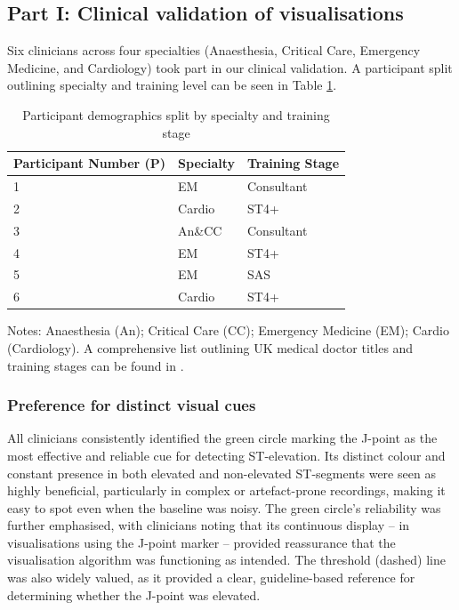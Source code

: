 \documentclass[
  10pt,
  letterpaper,
]{article}
\begin{document}
\subsection{Part I: Clinical validation of
visualisations}\label{part-i-clinical-validation-of-visualisations-1}

Six clinicians across four specialties (Anaesthesia, Critical Care,
Emergency Medicine, and Cardiology) took part in our clinical
validation. A participant split outlining specialty and training level
can be seen in Table \ref{specialty}.

\begin{table}[ht]
\caption{Participant demographics split by specialty and training stage\label{specialty}}%
\centering
\begin{tabularx}{.8\textwidth}{l X X}
\toprule
Participant Number (P) & Specialty  & Training Stage \\
\midrule
1    & EM           & Consultant  \\
2    & Cardio       & ST4+  \\
3    & An\&CC       & Consultant  \\
4    & EM           & ST4+  \\
5    & EM           & SAS  \\
6    & Cardio       & ST4+ \\
\bottomrule
\end{tabularx}
\begin{tablenotes}
\item Notes: Anaesthesia (An); Critical Care (CC); Emergency Medicine (EM); Cardio (Cardiology). A comprehensive list outlining UK medical doctor titles and training stages can be found in \cite{bma_training}.
\end{tablenotes}
\end{table}%

\subsubsection{Preference for distinct visual
cues}\label{preference-for-distinct-visual-cues}

All clinicians consistently identified the green circle marking the
J-point as the most effective and reliable cue for detecting
ST-elevation. Its distinct colour and constant presence in both elevated
and non-elevated ST-segments were seen as highly beneficial,
particularly in complex or artefact-prone recordings, making it easy to
spot even when the baseline was noisy. The green circle's reliability
was further emphasised, with clinicians noting that its continuous
display -- in visualisations using the J-point marker -- provided
reassurance that the visualisation algorithm was functioning as
intended. The threshold (dashed) line was also widely valued, as it
provided a clear, guideline-based reference for determining whether the
J-point was elevated.
\end{document}
